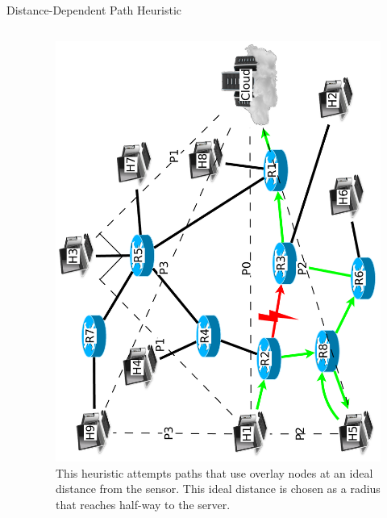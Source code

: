 \documentclass[pdftex]{beamer}
\begin{document}

\begin{frame}{Distance-Dependent Path Heuristic}
\begin{columns}
\begin{column}{.5\textwidth}

\begin{algorithm}[H]
\DontPrintSemicolon
{}
\SetAlgoLined
\SetAlgoLongEnd
\scriptsize
\caption{}
\small
\end{algorithm}
\end{column}
	
\begin{column}{.5\textwidth}
\begin{figure}
\includegraphics[height=\textwidth,angle=-90]{new_angle}
\caption{This heuristic attempts paths that use overlay nodes at an ideal distance from the sensor.  This ideal distance is chosen as a radius that reaches half-way to the server.}
\end{figure}
\end{column}

\end{columns}
\end{frame}
\end{document}
